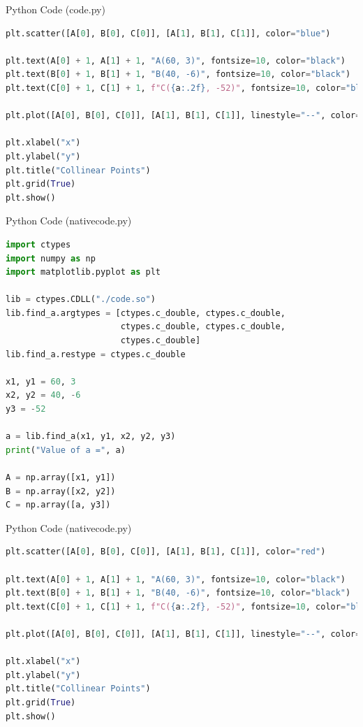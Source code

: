 \documentclass{beamer}
\begin{document}
\begin{frame}[fragile]{Python Code (code.py)}
\begin{lstlisting}[language=Python]
plt.scatter([A[0], B[0], C[0]], [A[1], B[1], C[1]], color="blue")

plt.text(A[0] + 1, A[1] + 1, "A(60, 3)", fontsize=10, color="black")
plt.text(B[0] + 1, B[1] + 1, "B(40, -6)", fontsize=10, color="black")
plt.text(C[0] + 1, C[1] + 1, f"C({a:.2f}, -52)", fontsize=10, color="black")

plt.plot([A[0], B[0], C[0]], [A[1], B[1], C[1]], linestyle="--", color="red")

plt.xlabel("x")
plt.ylabel("y")
plt.title("Collinear Points")
plt.grid(True)
plt.show()
\end{lstlisting}
\end{frame}
\begin{frame}[fragile]{Python Code (nativecode.py)}
\begin{lstlisting}[language=Python]
import ctypes
import numpy as np
import matplotlib.pyplot as plt

lib = ctypes.CDLL("./code.so")
lib.find_a.argtypes = [ctypes.c_double, ctypes.c_double,
                       ctypes.c_double, ctypes.c_double,
                       ctypes.c_double]
lib.find_a.restype = ctypes.c_double

x1, y1 = 60, 3
x2, y2 = 40, -6
y3 = -52

a = lib.find_a(x1, y1, x2, y2, y3)
print("Value of a =", a)

A = np.array([x1, y1])
B = np.array([x2, y2])
C = np.array([a, y3])
\end{lstlisting}
\end{frame}
\begin{frame}[fragile]{Python Code (nativecode.py)}
\begin{lstlisting}[language=Python]
plt.scatter([A[0], B[0], C[0]], [A[1], B[1], C[1]], color="red")

plt.text(A[0] + 1, A[1] + 1, "A(60, 3)", fontsize=10, color="black")
plt.text(B[0] + 1, B[1] + 1, "B(40, -6)", fontsize=10, color="black")
plt.text(C[0] + 1, C[1] + 1, f"C({a:.2f}, -52)", fontsize=10, color="black")

plt.plot([A[0], B[0], C[0]], [A[1], B[1], C[1]], linestyle="--", color="blue")

plt.xlabel("x")
plt.ylabel("y")
plt.title("Collinear Points")
plt.grid(True)
plt.show()
\end{lstlisting}
\end{frame}
\end{document}
